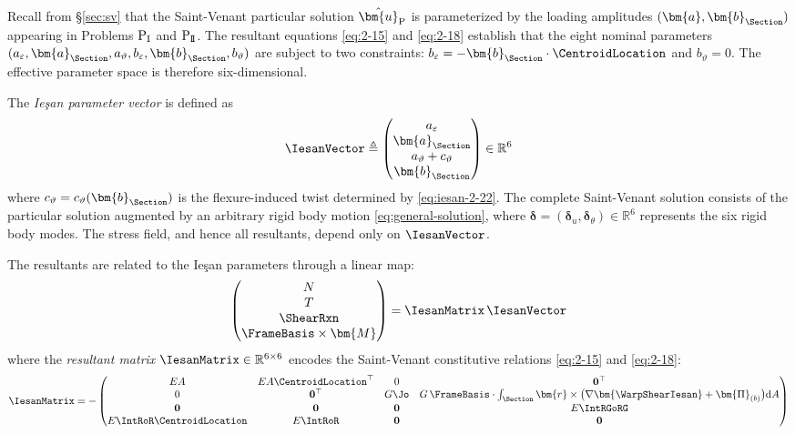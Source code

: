 Recall from \S\ref{sec:sv} that the Saint-Venant particular solution 
$\hat{\bm{u}}_{\rm P}$ is parameterized by the loading amplitudes 
$(\bm{a}, \bm{b}_\Section)$ appearing in Problems $\mathrm{P}_{\rm I}$ and 
$\mathrm{P}_{\rm I\!I}$. 
The resultant equations \eqref{eq:2-15} and \eqref{eq:2-18} establish that the 
eight nominal parameters 
$(a_\varepsilon, \bm{a}_\Section, a_\vartheta, b_\varepsilon, \bm{b}_\Section, b_\vartheta)$ 
are subject to two constraints: $b_\varepsilon = -\bm{b}_\Section \cdot \CentroidLocation$ 
and $b_\vartheta = 0$. 
The effective parameter space is therefore six-dimensional.

The \emph{Ie\c{s}an parameter vector} is defined as
\begin{equation}
\IesanVector \triangleq \begin{pmatrix} 
a_\varepsilon \\ \bm{a}_\Section \\ a_\vartheta + c_\vartheta \\ \bm{b}_\Section 
\end{pmatrix} \in \mathbb{R}^{6}
\label{eq:def-iesan-params}
\end{equation}
where $c_\vartheta = c_\vartheta(\bm{b}_\Section)$ is the flexure-induced twist 
determined by \eqref{eq:iesan-2-22}. 
The complete Saint-Venant solution consists of the particular solution 
augmented by an arbitrary rigid body motion \eqref{eq:general-solution}, 
where $\bm{\delta} = (\bm{\delta}_u, \bm{\delta}_\theta) \in \mathbb{R}^6$ 
represents the six rigid body modes. 
The stress field, and hence all resultants, depend only on $\IesanVector$.

The resultants are related to the Ie\c{s}an parameters through a linear map:
\begin{equation}
\begin{pmatrix} N \\ T \\ \ShearRxn \\ \FrameBasis \times \bm{M} \end{pmatrix}
= \IesanMatrix \, \IesanVector
\label{eq:resultant-map}
\end{equation}
where the \emph{resultant matrix} $\IesanMatrix \in \mathbb{R}^{6 \times 6}$ 
encodes the Saint-Venant constitutive relations \eqref{eq:2-15} and \eqref{eq:2-18}:
\begin{equation}
\IesanMatrix = -\begin{pmatrix}
EA & EA\CentroidLocation^\top & 0 & \mathbf{0}^\top \\
0 & \mathbf{0}^\top & G\Jo & G\,\FrameBasis \cdot \int_\Section \bm{r} \times 
\big(\nabla\bm{\WarpShearIesan} + \bm{\Pi}_{(b)}\big) \mathrm{d}A \\
\mathbf{0} & \mathbf{0} & \mathbf{0} & E\IntRGoRG  \\
E\IntRoR \CentroidLocation & E\IntRoR & \mathbf{0} & \mathbf{0}
\end{pmatrix}
\label{eq:def-R-matrix}
\end{equation}


